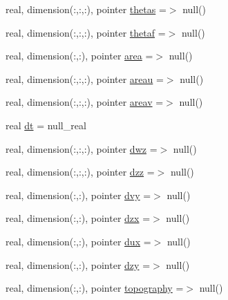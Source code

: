\begin{DoxyCompactItemize}
\item 
real, dimension(\+:,\+:,\+:), pointer \mbox{\hyperlink{structmoduleporousmediaproperties_1_1t__extvar_a7c9f5c7a8a6dd96bb94c6cf1f7a646d9}{thetas}} =$>$ null()
\item 
real, dimension(\+:,\+:,\+:), pointer \mbox{\hyperlink{structmoduleporousmediaproperties_1_1t__extvar_ac76cf2d5033599f5748bff64cb17573c}{thetaf}} =$>$ null()
\item 
real, dimension(\+:,\+:), pointer \mbox{\hyperlink{structmoduleporousmediaproperties_1_1t__extvar_a2e35e85bc7395827093941d1a2eaae23}{area}} =$>$ null()
\item 
real, dimension(\+:,\+:,\+:), pointer \mbox{\hyperlink{structmoduleporousmediaproperties_1_1t__extvar_af1b2a1b46e2600310d2d47b4d47fe433}{areau}} =$>$ null()
\item 
real, dimension(\+:,\+:,\+:), pointer \mbox{\hyperlink{structmoduleporousmediaproperties_1_1t__extvar_a993c796e7c0ccba4e761cf0f7ca91bdd}{areav}} =$>$ null()
\item 
real \mbox{\hyperlink{structmoduleporousmediaproperties_1_1t__extvar_a96e8d35492c7d61b74aebdc99b32d0fd}{dt}} = null\+\_\+real
\item 
real, dimension(\+:,\+:,\+:), pointer \mbox{\hyperlink{structmoduleporousmediaproperties_1_1t__extvar_ae92d23b6de072007f6d08c2ca296f46c}{dwz}} =$>$ null()
\item 
real, dimension(\+:,\+:,\+:), pointer \mbox{\hyperlink{structmoduleporousmediaproperties_1_1t__extvar_a61decade4dc2255fd5fe7473a9c8f603}{dzz}} =$>$ null()
\item 
real, dimension(\+:,\+:), pointer \mbox{\hyperlink{structmoduleporousmediaproperties_1_1t__extvar_ab1131feb01f9eab7cd3a47f7a206603e}{dvy}} =$>$ null()
\item 
real, dimension(\+:,\+:), pointer \mbox{\hyperlink{structmoduleporousmediaproperties_1_1t__extvar_a0e24ef66ad864b865dd0bf061c9be87b}{dzx}} =$>$ null()
\item 
real, dimension(\+:,\+:), pointer \mbox{\hyperlink{structmoduleporousmediaproperties_1_1t__extvar_a914371be0de63f22f9c40d34a9f260c1}{dux}} =$>$ null()
\item 
real, dimension(\+:,\+:), pointer \mbox{\hyperlink{structmoduleporousmediaproperties_1_1t__extvar_adaffcff78160ccca1f829f3e22a6dcf5}{dzy}} =$>$ null()
\item 
real, dimension(\+:,\+:), pointer \mbox{\hyperlink{structmoduleporousmediaproperties_1_1t__extvar_a4c7ff8d6df8e6abd9aaa60a8e0e28960}{topography}} =$>$ null()
\item 

\end{DoxyCompactItemize}
